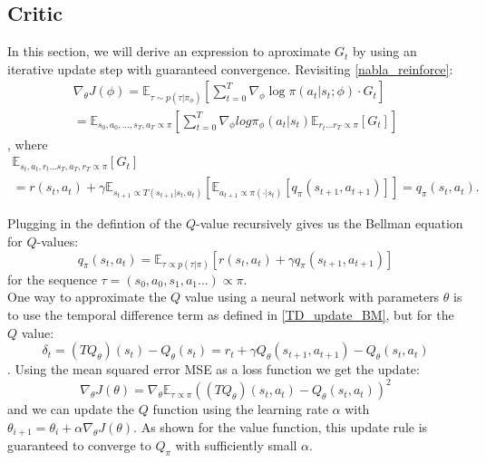 \subsection{Critic}
In this section, we will derive an expression to aproximate $G_t$ by using an iterative update step with guaranteed convergence.
Revisiting \ref{nabla_reinforce}: 
\begin{equation}
    \label{ac policy update}
    \begin{aligned}
        \nabla_{\theta} J(\phi) = \mathbb{E}_{\tau \sim p(\tau | \pi_{\phi})} \left[ \sum_{t=0}^T \nabla_{\phi} \log \pi(a_t|s_t;\phi) \cdot  G_t\right]\\
        = \mathbb{E}_{s_0, a_0, ... ,s_T, a_T \propto \pi} \left[
            \sum_{t=0}^{T}\nabla_{\phi} log \pi_{\phi}(a_t|s_t) \mathbb{E}_{r_t...r_T \propto \pi} \left[ G_t \right]
        \right]
    \end{aligned}
\end{equation}
, where 
\begin{equation}
    \begin{align}
        \mathbb{E}_{s_t, a_t, r_t...s_T, a_T, r_T \propto \pi} \left[ G_t \right] \\
        = r(s_t,a_t) + \gamma \mathbb{E}_{s_{t+1} \propto T(s_{t+1}|s_t, a_t)}\left[\mathbb{E}_{a_{t+1} \propto \pi(\cdot|s_t)}  \left[q_{\pi}(s_{t+1},a_{t+1})\right]  \right]
        = q_{\pi}(s_{t},a_{t}).
    \end{align}
\end{equation}

Plugging in the defintion of the $Q$-value recursively gives us the Bellman equation for $Q$-values:
\begin{equation}
q_{\pi}(s_t, a_t) = \mathbb{E}_{\tau \propto p(\tau|\pi)} \left[ r(s_t,a_t) + \gamma q_{\pi}(s_{t+1}, a_{t+1})\right]
\end{equation}
for the sequence $\tau = (s_0,a_0, s_1, a_1...) \propto \pi$.\\

One way to approximate the $Q$ value using a neural network with parameters $\theta$ is to use the temporal difference term as defined in \ref{TD_update_BM}, but for the $Q$ value:
\begin{equation}
    \label{Q-ValueTD}
    \delta_t = (T Q_{\theta})(s_t) - Q_{\theta}(s_t) = r_t + \gamma Q_{\theta}(s_{t+1}, a_{t+1}) - Q_{\theta}(s_{t}, a_{t})
\end{equation}
. Using the mean squared error MSE as a loss function we get the update:
\begin{equation}
    \nabla_{\theta} J(\theta) = \nabla_{\theta} \mathbb{E}_{\tau \propto \pi}((T Q_{\theta})(s_t, a_t) - Q_{\theta}(s_t, a_t))^2
\end{equation}
and we can update the $Q$ function using the learning rate $\alpha$ with $\theta_{i+1} = \theta_i + \alpha \nabla_{\theta} J(\theta)$. As shown for the value 
function, this update rule is guaranteed to converge to $Q_{\pi}$ with sufficiently small $\alpha$.

